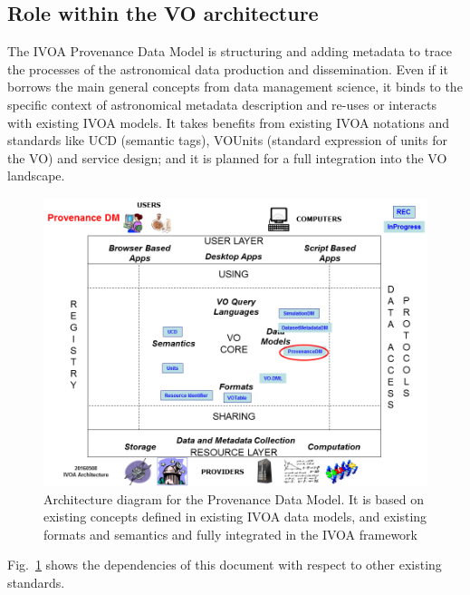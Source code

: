 \subsection{Role within the VO architecture}

The IVOA Provenance Data Model is structuring and adding metadata to trace the processes of the astronomical data production and dissemination. Even if it borrows the main general concepts from data management science, it binds to the specific context of astronomical metadata description and re-uses or interacts with existing IVOA models. It takes benefits from existing IVOA notations and standards like UCD (semantic tags), VOUnits (standard expression of units for the VO) and service design; and it is planned for a full integration into the VO landscape.

\begin{figure}
\centering
\includegraphics[width=\textwidth]{VOArchitecture-Prov2016.png}
\caption[Architecture diagram for the Provenance Data Model]{Architecture diagram for the Provenance Data Model. It is based on existing concepts defined in existing IVOA data models, and existing formats and semantics and fully integrated in the IVOA framework}
\label{fig:archdiag}
\end{figure}

Fig.~\ref{fig:archdiag} shows the dependencies of this document with respect to other existing standards.
